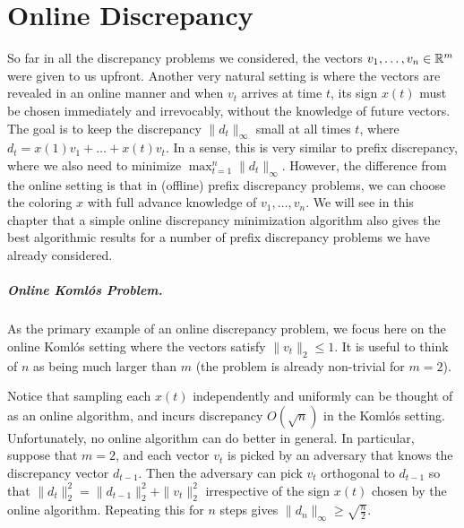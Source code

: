 \chapter{Online Discrepancy}
\label{ch:online}

So far in all the discrepancy problems we considered, the vectors $v_1,\ldots,v_n \in \mathbb{R}^m$ were given to us upfront. Another very natural setting is where the vectors are revealed in an online manner and when $v_t$ arrives at time $t$, its sign $x(t)$  must be chosen immediately and irrevocably, without the knowledge of future vectors.
The goal is to keep the discrepancy $\|d_t\|_\infty$ small at all times $t$, where  $d_t = x(1) v_1 + \ldots + x(t) v_t$. In a sense, this is very similar
to prefix discrepancy, where we also need to minimize $\max_{t = 1}^n
\|d_t\|_\infty$. However, the difference from the online setting is that in (offline) prefix discrepancy problems, we can choose the coloring
$x$ with full advance knowledge of $v_1, \ldots, v_n$. We will see in this
chapter that a simple online discrepancy minimization algorithm also
gives the best algorithmic results for a number of prefix discrepancy
problems we have already considered. 

\paragraph{Online Koml\'{o}s Problem.}

As the primary example of an online discrepancy problem, we focus here on the online Koml\'{o}s setting where the vectors satisfy $\|v_t\|_2 \leq 1$. It is useful to think of $n$ as being much larger than $m$ (the problem is already non-trivial for $m=2$). %

Notice that sampling each $x(t)$ independently and uniformly can be
thought of as an online algorithm, and incurs discrepancy $O(\sqrt{n})$
in the Koml\'os setting.
Unfortunately, no online algorithm can do better in general. In
particular, suppose that $m=2$, and each vector $v_t$ is picked by an
adversary that knows the discrepancy vector $d_{t-1}$. Then the adversary can pick $v_t$
orthogonal to $d_{t-1}$ so that $\|d_t\|_2^2 = \|d_{t-1}\|_2^2 +
\|v_t\|_2^2$ irrespective of the sign $x(t)$ chosen by the online
algorithm. Repeating this for $n$ steps gives $\|d_n\|_\infty \ge
\sqrt{\frac{n}{2}}$. 



